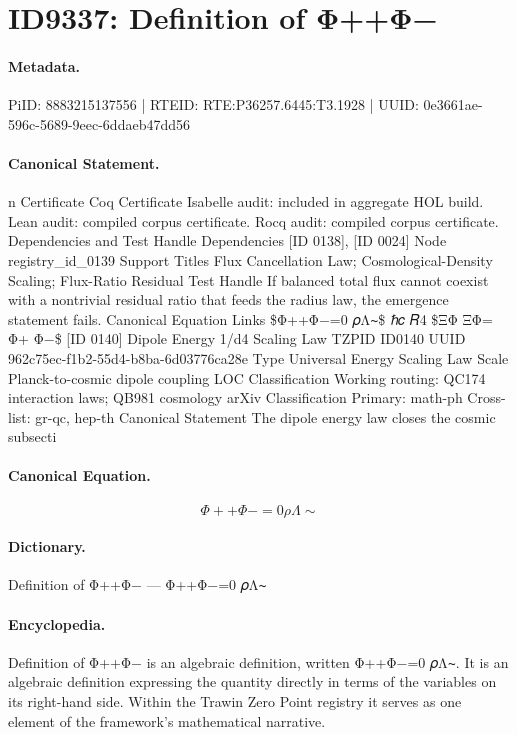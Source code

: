 \section*{ID9337: Definition of Φ++Φ−}
\paragraph{Metadata.}
PiID: 8883215137556 | RTEID: RTE:P36257.6445:T3.1928 | UUID: 0e3661ae-596c-5689-9eec-6ddaeb47dd56

\paragraph{Canonical Statement.}
n Certificate Coq Certificate Isabelle audit: included in aggregate HOL build. Lean audit: compiled corpus certificate. Rocq audit: compiled corpus certificate. Dependencies and Test Handle Dependencies [ID 0138], [ID 0024] Node registry\_id\_0139 Support Titles Flux Cancellation Law; Cosmological-Density Scaling; Flux-Ratio Residual Test Handle If balanced total flux cannot coexist with a nontrivial residual ratio that feeds the radius law, the emergence statement fails. Canonical Equation Links \$Φ++Φ−=0 𝜌Λ∼\$ ℏ𝑐 𝑅4 \$ΞΦ ΞΦ= Φ+ Φ−\$ [ID 0140] Dipole Energy 1/d4 Scaling Law TZPID ID0140 UUID 962c75ec-f1b2-55d4-b8ba-6d03776ca28e Type Universal Energy Scaling Law Scale Planck-to-cosmic dipole coupling LOC Classification Working routing: QC174 interaction laws; QB981 cosmology arXiv Classification Primary: math-ph Cross-list: gr-qc, hep-th Canonical Statement The dipole energy law closes the cosmic subsecti

\paragraph{Canonical Equation.}
\[
Φ++Φ−=0 𝜌Λ∼
\]

\paragraph{Dictionary.}
Definition of Φ++Φ− — Φ++Φ−=0 𝜌Λ∼

\paragraph{Encyclopedia.}
Definition of Φ++Φ− is an algebraic definition, written Φ++Φ−=0 𝜌Λ∼. It is an algebraic definition expressing the quantity directly in terms of the variables on its right-hand side. Within the Trawin Zero Point registry it serves as one element of the framework's mathematical narrative.
